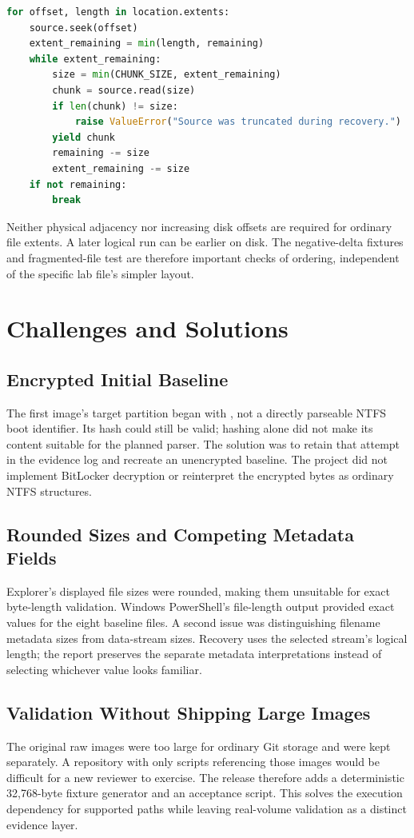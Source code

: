 \begin{lstlisting}[language=Python,caption={Bounded extent reads from the release recovery module.},label={lst:extent}]
for offset, length in location.extents:
    source.seek(offset)
    extent_remaining = min(length, remaining)
    while extent_remaining:
        size = min(CHUNK_SIZE, extent_remaining)
        chunk = source.read(size)
        if len(chunk) != size:
            raise ValueError("Source was truncated during recovery.")
        yield chunk
        remaining -= size
        extent_remaining -= size
    if not remaining:
        break
\end{lstlisting}

Neither physical adjacency nor increasing disk offsets are required for
ordinary file extents. A later logical run can be earlier on disk. The
negative-delta fixtures and fragmented-file test are therefore important
checks of ordering, independent of the specific lab file's simpler layout.

\section{Challenges and Solutions}
\subsection{Encrypted Initial Baseline}
The first image's target partition began with , not a directly
parseable NTFS boot identifier. Its hash could still be valid; hashing alone
did not make its content suitable for the planned parser. The solution was
to retain that attempt in the evidence log and recreate an unencrypted
baseline. The project did not implement BitLocker decryption or reinterpret
the encrypted bytes as ordinary NTFS structures.

\subsection{Rounded Sizes and Competing Metadata Fields}
Explorer's displayed file sizes were rounded, making them unsuitable for
exact byte-length validation. Windows PowerShell's file-length output
provided exact values for the eight baseline files. A second issue was
distinguishing filename metadata sizes from data-stream sizes. Recovery
uses the selected stream's logical length; the report preserves the separate
metadata interpretations instead of selecting whichever value looks familiar.

\subsection{Validation Without Shipping Large Images}
The original raw images were too large for ordinary Git storage and were
kept separately. A repository with only scripts referencing those images
would be difficult for a new reviewer to exercise. The release therefore
adds a deterministic 32,768-byte fixture generator and an acceptance script.
This solves the execution dependency for supported paths while leaving
real-volume validation as a distinct evidence layer.

